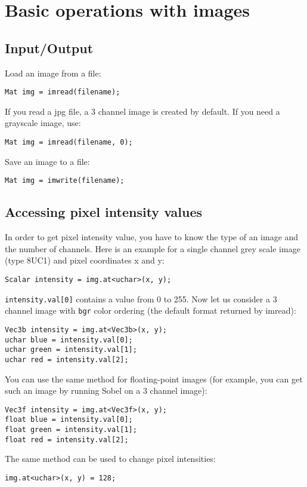 \section{Basic operations with images}


\ifCpp
\subsection{Input/Output}
Load an image from a file:
\begin{lstlisting}
Mat img = imread(filename);
\end{lstlisting}
If you read a jpg file, a 3 channel image is created by default. If you need a grayscale image, use:
\begin{lstlisting}
Mat img = imread(filename, 0);
\end{lstlisting}
Save an image to a file:
\begin{lstlisting}
Mat img = imwrite(filename);
\end{lstlisting}

\subsection{Accessing pixel intensity values}
In order to get pixel intensity value, you have to know the type of an image and the number of channels. Here is an example for a single channel grey scale image (type 8UC1) and pixel coordinates x and y:
\begin{lstlisting}
Scalar intensity = img.at<uchar>(x, y);
\end{lstlisting}
\texttt{intensity.val[0]} contains a value from 0 to 255. 
Now let us consider a 3 channel image with \texttt{bgr} color ordering (the default format returned by imread):
\begin{lstlisting}
Vec3b intensity = img.at<Vec3b>(x, y);
uchar blue = intensity.val[0];
uchar green = intensity.val[1];
uchar red = intensity.val[2];
\end{lstlisting}
You can use the same method for floating-point images (for example, you can get such an image by running Sobel on a 3 channel image):
\begin{lstlisting}
Vec3f intensity = img.at<Vec3f>(x, y);
float blue = intensity.val[0];
float green = intensity.val[1];
float red = intensity.val[2];
\end{lstlisting}
The same method can be used to change pixel intensities:
\begin{lstlisting}
img.at<uchar>(x, y) = 128;
\end{lstlisting}


